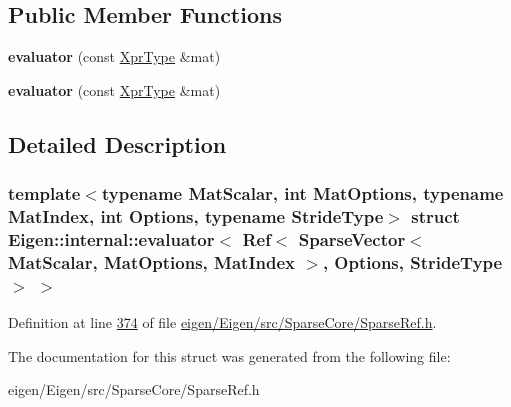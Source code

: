 \subsection*{Public Member Functions}
\begin{DoxyCompactItemize}
\item 
\mbox{\label{struct_eigen_1_1internal_1_1evaluator_3_01_ref_3_01_sparse_vector_3_01_mat_scalar_00_01_mat_optic924bcdf873ee6e467b0642118d17ceb_ad366f882d9f4c24912b72072e2edae2d}} 
{\bfseries evaluator} (const \hyperlink{group___sparse_core___module_class_eigen_1_1_ref_3_01_sparse_vector_3_01_mat_scalar_00_01_mat_options_00_01_mat_index_01_4_00357b3c2eca55b7ce618d0a2b2447510f}{Xpr\+Type} \&mat)
\item 
\mbox{\label{struct_eigen_1_1internal_1_1evaluator_3_01_ref_3_01_sparse_vector_3_01_mat_scalar_00_01_mat_optic924bcdf873ee6e467b0642118d17ceb_ad366f882d9f4c24912b72072e2edae2d}} 
{\bfseries evaluator} (const \hyperlink{group___sparse_core___module_class_eigen_1_1_ref_3_01_sparse_vector_3_01_mat_scalar_00_01_mat_options_00_01_mat_index_01_4_00357b3c2eca55b7ce618d0a2b2447510f}{Xpr\+Type} \&mat)
\end{DoxyCompactItemize}


\subsection{Detailed Description}
\subsubsection*{template$<$typename Mat\+Scalar, int Mat\+Options, typename Mat\+Index, int Options, typename Stride\+Type$>$\newline
struct Eigen\+::internal\+::evaluator$<$ Ref$<$ Sparse\+Vector$<$ Mat\+Scalar, Mat\+Options, Mat\+Index $>$, Options, Stride\+Type $>$ $>$}



Definition at line \hyperlink{eigen_2_eigen_2src_2_sparse_core_2_sparse_ref_8h_source_l00374}{374} of file \hyperlink{eigen_2_eigen_2src_2_sparse_core_2_sparse_ref_8h_source}{eigen/\+Eigen/src/\+Sparse\+Core/\+Sparse\+Ref.\+h}.



The documentation for this struct was generated from the following file\+:\begin{DoxyCompactItemize}
\item 
eigen/\+Eigen/src/\+Sparse\+Core/\+Sparse\+Ref.\+h\end{DoxyCompactItemize}
